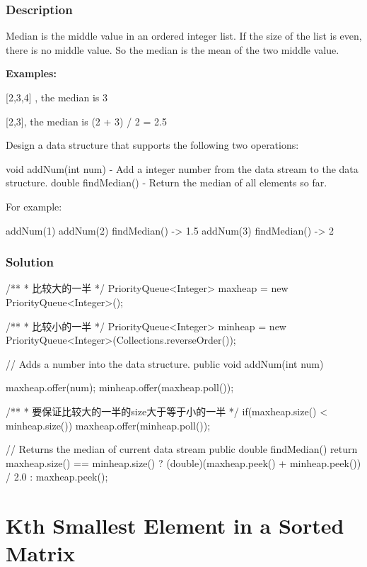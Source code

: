 \subsubsection{Description}
Median is the middle value in an ordered integer list. If the size of the list is even, there is no middle value. So the median is the mean of the two middle value.

\textbf{Examples:}

[2,3,4] , the median is 3

[2,3], the median is (2 + 3) / 2 = 2.5

Design a data structure that supports the following two operations:

void addNum(int num) - Add a integer number from the data stream to the data structure.
double findMedian() - Return the median of all elements so far.

For example:
\begin{Code}
addNum(1)
addNum(2)
findMedian() -> 1.5
addNum(3)
findMedian() -> 2
\end{Code}

\subsubsection{Solution}

\begin{Code}
/**
 * 比较大的一半
 */
PriorityQueue<Integer> maxheap = new PriorityQueue<Integer>();

/**
 * 比较小的一半
 */
PriorityQueue<Integer> minheap = new PriorityQueue<Integer>(Collections.reverseOrder());

// Adds a number into the data structure.
public void addNum(int num) {
    maxheap.offer(num);
    minheap.offer(maxheap.poll());

    /**
     * 要保证比较大的一半的size大于等于小的一半
     */
    if(maxheap.size() < minheap.size()){
        maxheap.offer(minheap.poll());
    }
}

// Returns the median of current data stream
public double findMedian() {
    return maxheap.size() == minheap.size() ?
        (double)(maxheap.peek() + minheap.peek()) / 2.0 : maxheap.peek();
}
\end{Code}

\newpage

\section{Kth Smallest Element in a Sorted Matrix} %


